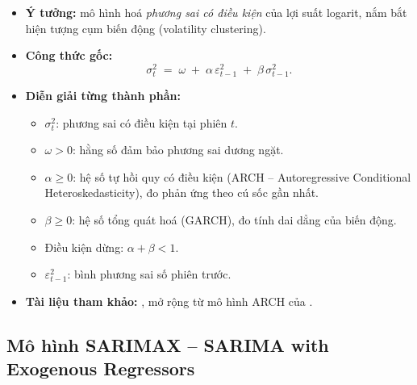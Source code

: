 \documentclass[12pt,a4paper,openany,oneside]{report}
\numberwithin{equation}{chapter}
\begin{document}
\begin{itemize}[leftmargin=18pt,topsep=2pt,itemsep=4pt]
  \item \textbf{Ý tưởng:} mô hình hoá \emph{phương sai có điều kiện}
        của lợi suất logarit, nắm bắt hiện tượng cụm biến động
        (volatility clustering).
  \item \textbf{Công thức gốc:}
        \begin{equation}
          \sigma_t^2 \;=\; \omega \;+\; \alpha\,\varepsilon_{t-1}^{2}
                                  \;+\; \beta\,\sigma_{t-1}^{2}.
          \label{eq:garch}
        \end{equation}
  \item \textbf{Diễn giải từng thành phần:}
        \begin{itemize}[leftmargin=14pt,topsep=2pt,itemsep=1pt]
          \item $\sigma_t^2$: phương sai có điều kiện tại phiên $t$.
          \item $\omega > 0$: hằng số đảm bảo phương sai dương ngặt.
          \item $\alpha \ge 0$: hệ số tự hồi quy có điều kiện
                (ARCH -- Autoregressive Conditional Heteroskedasticity),
                đo phản ứng theo cú sốc gần nhất.
          \item $\beta \ge 0$: hệ số tổng quát hoá (GARCH), đo tính
                dai dẳng của biến động.
          \item Điều kiện dừng: $\alpha + \beta < 1$.
          \item $\varepsilon_{t-1}^{2}$: bình phương sai số phiên trước.
        \end{itemize}
  \item \textbf{Tài liệu tham khảo:} \citet{Bollerslev1986}, mở rộng từ
        mô hình ARCH của \citet{Engle1982}.
\end{itemize}

\subsection{Mô hình SARIMAX -- SARIMA with Exogenous Regressors}
\end{document}
